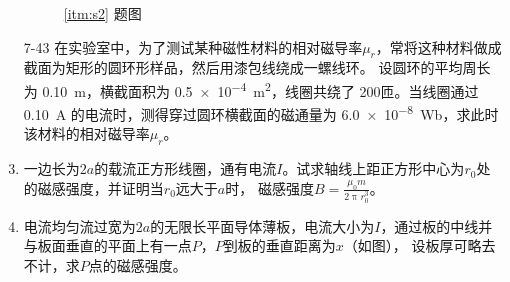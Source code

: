 \documentclass[UTF-8]{ctexart}
\newcommand{\csi}[2]{ \SI{#1}{#2}}
\begin{document}
\begin{enumerate}
\begin{figure}[htb]
\begin{minipage}[b]{0.4\textwidth}
                \caption{\ref{itm:s2} 题图}
            \end{minipage}
        \end{figure}
        
    \item[7-43] 在实验室中，为了测试某种磁性材料的相对磁导率\(\mu_r\)，常将这种材料做成截面为矩形的圆环形样品，然后用漆包线绕成一螺线环。
        设圆环的平均周长为\csi{0.10}{\m}，横截面积为\csi{0.5e-4}{\square\m}，线圈共绕了\csi{200}{}匝。当线圈通过\csi{0.10}{\A}
        的电流时，测得穿过圆环横截面的磁通量为\csi{6.0e-8}{\weber}，求此时该材料的相对磁导率\(\mu_r\)。
    
    \item 一边长为\(2a\)的载流正方形线圈，通有电流\(I\)。试求轴线上距正方形中心为\(r_0\)处的磁感强度，并证明当\(r_0\)远大于\(a\)时，
        磁感强度\(B=\frac{\mu_0m}{2\uppi r_0^3}\)。

    \item \label{itm:s2} 电流均匀流过宽为\(2a\)的无限长平面导体薄板，电流大小为\(I\)，通过板的中线并与板面垂直的平面上有一点\(P\)，\(P\)到板的垂直距离为\(x\)（如图），
        设板厚可略去不计，求\(P\)点的磁感强度。


\end{enumerate}
\end{document}
